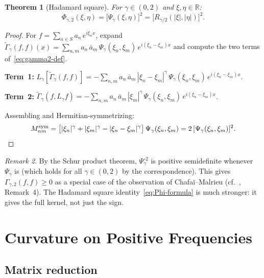 \documentclass[11pt,a4paper]{article}
\theoremstyle{plain}
\newtheorem{theorem}{Theorem}[section]
\theoremstyle{definition}
\theoremstyle{remark}
\newtheorem{remark}[theorem]{Remark}
\newcommand{\R}{\mathbb{R}}
\begin{document}
\begin{theorem}[Hadamard square]\label{thm:gamma2-kernel}
For $\gamma \in (0,2)$ and $\xi,\eta \in \R$:
\begin{equation}\label{eq:Phi-formula}
  \Phi_{\gamma,2}(\xi,\eta) = \bigl[\Psi_\gamma(\xi,\eta)\bigr]^2
  = \bigl[R_{\gamma/2}(|\xi|,|\eta|)\bigr]^2.
\end{equation}
\end{theorem}

\begin{proof}
For $f = \sum_{n \in S} a_n\,e^{i\xi_n x}$, expand
$\widetilde{\Gamma}_\gamma(f,f)(x)
= \sum_{n,m} a_n\,\bar{a}_m\,\Psi_\gamma(\xi_n,\xi_m)\,
  e^{i(\xi_n-\xi_m)x}$
and compute the two terms of~\eqref{eq:gamma2-def}.

\textbf{Term~1:}
$L_\gamma[\widetilde{\Gamma}_\gamma(f,f)] =
-\sum_{n,m} a_n\,\bar{a}_m\,|\xi_n-\xi_m|^\gamma\,
\Psi_\gamma(\xi_n,\xi_m)\,e^{i(\xi_n-\xi_m)x}$.

\textbf{Term~2:}
$\widetilde{\Gamma}_\gamma(f, L_\gamma f) =
-\sum_{n,m} a_n\,\bar{a}_m\,|\xi_m|^\gamma\,
\Psi_\gamma(\xi_n,\xi_m)\,e^{i(\xi_n-\xi_m)x}$.

Assembling and Hermitian-symmetrizing:
\[
  M_{nm}^{\mathrm{sym}}
  = \bigl[|\xi_n|^\gamma + |\xi_m|^\gamma - |\xi_n-\xi_m|^\gamma\bigr]\,
  \Psi_\gamma(\xi_n,\xi_m)
  = 2\,[\Psi_\gamma(\xi_n,\xi_m)]^2. \qedhere
\]
\end{proof}

\begin{remark}\label{rem:hadamard}
By the Schur product theorem, $\Psi_\gamma^{\circ 2}$ is positive
semidefinite whenever $\Psi_\gamma$ is (which holds for all
$\gamma \in (0,2)$ by the correspondence). This gives $\Gamma_{\gamma,2}(f,f) \geq 0$
as a special case of the observation of Chafa\"i--Malrieu
(cf.~\cite{GentilImbert2008}, Remark~4). The Hadamard square
identity~\eqref{eq:Phi-formula} is much stronger: it gives the
full kernel, not just the sign.
\end{remark}


\section{Curvature on Positive Frequencies}\label{sec:curvature}

\subsection{Matrix reduction}\label{sec:curv-pos}
\end{document}
